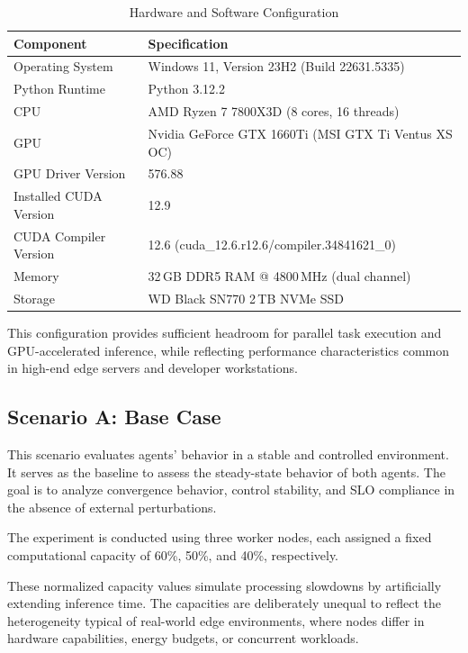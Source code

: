 \begin{table}[H]
\centering
\caption{Hardware and Software Configuration}
\label{tab:hardware-software}
\begin{tabular}{@{}ll@{}}
\toprule
\textbf{Component} & \textbf{Specification} \\
\midrule
Operating System & Windows 11, Version 23H2 (Build 22631.5335) \\
Python Runtime & Python 3.12.2 \\
CPU & AMD Ryzen 7 7800X3D (8 cores, 16 threads) \\
GPU & Nvidia GeForce GTX 1660Ti (MSI GTX Ti Ventus XS OC) \\
GPU Driver Version & 576.88 \\
Installed CUDA Version & 12.9 \\
CUDA Compiler Version & 12.6 (cuda\_12.6.r12.6/compiler.34841621\_0) \\
Memory & 32\,GB DDR5 RAM @ 4800\,MHz (dual channel) \\
Storage & WD Black SN770 2\,TB NVMe SSD \\
\bottomrule
\end{tabular}
\end{table}


This configuration provides sufficient headroom for parallel task execution and GPU-accelerated inference, while reflecting performance characteristics common in high-end edge servers and developer workstations.

\subsection{Scenario A: Base Case}
\label{sec:evaluation-base}

This scenario evaluates agents' behavior in a stable and controlled environment. It serves as the baseline to assess the steady-state behavior of both agents. The goal is to analyze convergence behavior, control stability, and SLO compliance in the absence of external perturbations.

The experiment is conducted using three worker nodes, each assigned a fixed computational capacity of 60\%, 50\%, and 40\%, respectively.

These normalized capacity values simulate processing slowdowns by artificially extending inference time. The capacities are deliberately unequal to reflect the heterogeneity typical of real-world edge environments, where nodes differ in hardware capabilities, energy budgets, or concurrent workloads.

